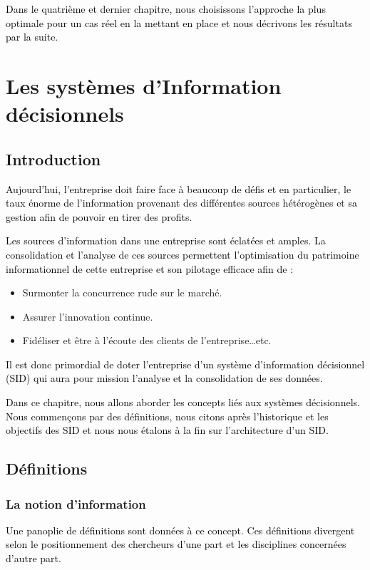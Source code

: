 \documentclass[a4paper,12pt]{report}
\begin{document}
\textcolor{black}{Dans le quatrième et dernier chapitre, nous choisissons l'approche la plus optimale pour un cas réel en la mettant en place et nous décrivons les résultats par la suite.
}




\chapter{Les systèmes d'Information décisionnels}

\section*{Introduction}
\textcolor{black}{Aujourd'hui, l'entreprise doit faire face à beaucoup de défis et en particulier, le taux énorme de l'information provenant des différentes sources hétérogènes et sa gestion afin de pouvoir en tirer des profits.} 

\textcolor{black}{Les sources d'information dans une entreprise sont éclatées et amples. La consolidation et l'analyse de ces sources permettent l’optimisation du patrimoine informationnel de cette entreprise et son pilotage efficace afin de :} 
\begin{itemize}
	\item  Surmonter la concurrence rude sur le marché.
	\item  Assurer l’innovation continue.
	\item  Fidéliser et être à l’écoute des clients de l’entreprise…etc.
\end{itemize}


\textcolor{black}{Il est donc primordial de doter l’entreprise d’un système d’information décisionnel (SID) qui aura pour mission l’analyse et la consolidation de ses données.}

\textcolor{black}{Dans ce chapitre, nous allons aborder les concepts liés aux systèmes décisionnels. Nous commençons par des définitions, nous citons après l’historique et les objectifs des SID et nous nous étalons à la fin sur l’architecture d’un SID.}
	

\section{Définitions}
\subsection{La notion d’information}
\textcolor{black}{Une panoplie de définitions sont données à ce concept. Ces définitions divergent selon le positionnement des chercheurs d’une part et les disciplines concernées d’autre part.}
\end{document}
